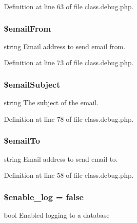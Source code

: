 Definition at line 63 of file class.\-debug.\-php.

\hypertarget{class_debug_a8812e953c70aa15f8f01e0a83230e645}{
\subsubsection[{\$email\-From}]{\setlength{\rightskip}{0pt plus 5cm}\$email\-From\hspace{0.3cm}{\ttfamily [static]}}}\label{class_debug_a8812e953c70aa15f8f01e0a83230e645}
string Email address to send email from. 

Definition at line 73 of file class.\-debug.\-php.

\hypertarget{class_debug_afc4243e1cc62688011c169b622433f64}{
\subsubsection[{\$email\-Subject}]{\setlength{\rightskip}{0pt plus 5cm}\$email\-Subject\hspace{0.3cm}{\ttfamily [static]}}}\label{class_debug_afc4243e1cc62688011c169b622433f64}
string The subject of the email. 

Definition at line 78 of file class.\-debug.\-php.

\hypertarget{class_debug_a2dca3002fa879522effbe7bd729d681d}{
\subsubsection[{\$email\-To}]{\setlength{\rightskip}{0pt plus 5cm}\$email\-To\hspace{0.3cm}{\ttfamily [static]}}}\label{class_debug_a2dca3002fa879522effbe7bd729d681d}
string Email address to send email to. 

Definition at line 58 of file class.\-debug.\-php.

\hypertarget{class_debug_abf6da1366fe6b13a73e55c0962433b5f}{
\subsubsection[{\$enable\-\_\-log}]{\setlength{\rightskip}{0pt plus 5cm}\$enable\-\_\-log = false\hspace{0.3cm}{\ttfamily [static]}}}\label{class_debug_abf6da1366fe6b13a73e55c0962433b5f}
bool Enabled logging to a database 

